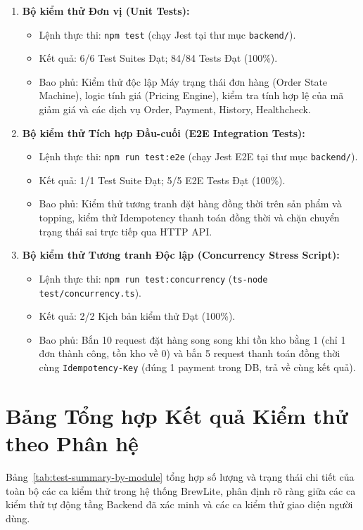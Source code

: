 \documentclass[12pt,a4paper,oneside]{report}
\begin{document}
\begin{enumerate}
    \item \textbf{Bộ kiểm thử Đơn vị (Unit Tests):}
    \begin{itemize}
        \item Lệnh thực thi: \texttt{npm test} (chạy Jest tại thư mục \texttt{backend/}).
        \item Kết quả: 6/6 Test Suites Đạt; 84/84 Tests Đạt (100\%).
        \item Bao phủ: Kiểm thử độc lập Máy trạng thái đơn hàng (Order State Machine), logic tính giá (Pricing Engine), kiểm tra tính hợp lệ của mã giảm giá và các dịch vụ Order, Payment, History, Healthcheck.
    \end{itemize}
    \item \textbf{Bộ kiểm thử Tích hợp Đầu-cuối (E2E Integration Tests):}
    \begin{itemize}
        \item Lệnh thực thi: \texttt{npm run test:e2e} (chạy Jest E2E tại thư mục \texttt{backend/}).
        \item Kết quả: 1/1 Test Suite Đạt; 5/5 E2E Tests Đạt (100\%).
        \item Bao phủ: Kiểm thử tương tranh đặt hàng đồng thời trên sản phẩm và topping, kiểm thử Idempotency thanh toán đồng thời và chặn chuyển trạng thái sai trực tiếp qua HTTP API.
    \end{itemize}
    \item \textbf{Bộ kiểm thử Tương tranh Độc lập (Concurrency Stress Script):}
    \begin{itemize}
        \item Lệnh thực thi: \texttt{npm run test:concurrency} (\texttt{ts-node test/concurrency.ts}).
        \item Kết quả: 2/2 Kịch bản kiểm thử Đạt (100\%).
        \item Bao phủ: Bắn 10 request đặt hàng song song khi tồn kho bằng 1 (chỉ 1 đơn thành công, tồn kho về 0) và bắn 5 request thanh toán đồng thời cùng \texttt{Idempotency-Key} (đúng 1 payment trong DB, trả về cùng kết quả).
    \end{itemize}
\end{enumerate}

\section{Bảng Tổng hợp Kết quả Kiểm thử theo Phân hệ}

Bảng~\ref{tab:test-summary-by-module} tổng hợp số lượng và trạng thái chi tiết của toàn bộ các ca kiểm thử trong hệ thống BrewLite, phân định rõ ràng giữa các ca kiểm thử tự động tầng Backend đã xác minh và các ca kiểm thử giao diện người dùng.
\end{document}
